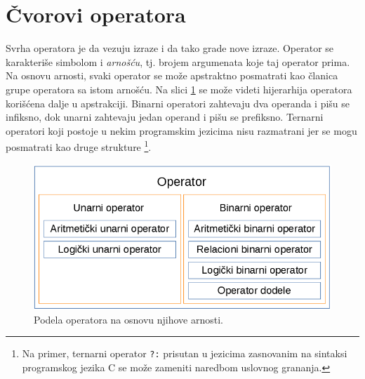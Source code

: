 \section{Čvorovi operatora}
\label{sec:MyASTOperatorNodes}

Svrha operatora je da vezuju izraze i da tako grade nove izraze. Operator se karakteriše simbolom i \emph{arnošću}, tj. brojem argumenata koje taj operator prima. Na osnovu arnosti, svaki operator se može apstraktno posmatrati kao članica grupe operatora sa istom arnošću. Na slici \ref{fig:OperatorNodes} se može videti hijerarhija operatora korišćena dalje u apstrakciji. Binarni operatori zahtevaju dva operanda i pišu se infiksno, dok unarni zahtevaju jedan operand i pišu se prefiksno. Ternarni operatori koji postoje u nekim programskim jezicima nisu razmatrani jer se mogu posmatrati kao druge strukture \footnote{Na primer, ternarni operator \texttt{?:} prisutan u jezicima zasnovanim na sintaksi programskog jezika C se može zameniti naredbom uslovnog grananja.}. 

\begin{figure}[h!]
\centering
\includegraphics[scale=0.5]{images/operator_nodes.png}
\caption{Podela operatora na osnovu njihove arnosti.}
\label{fig:OperatorNodes}
\end{figure}

